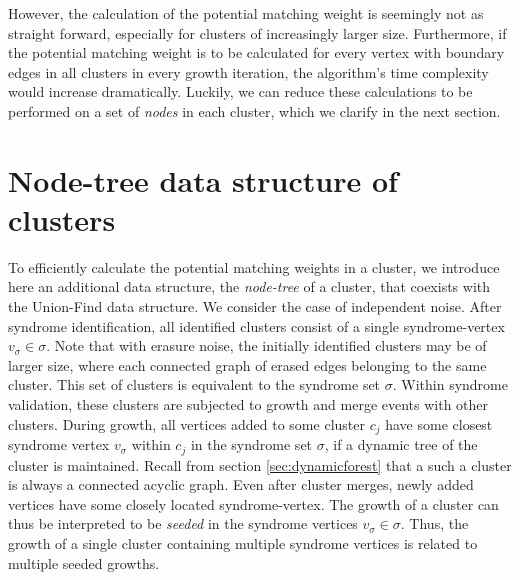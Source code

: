 However, the calculation of the potential matching weight is seemingly not as straight forward, especially for clusters of increasingly larger size. Furthermore, if the potential matching weight is to be calculated for every vertex with boundary edges in all clusters in every growth iteration, the algorithm's time complexity would increase dramatically. Luckily, we can reduce these calculations to be performed on a set of \emph{nodes} in each cluster, which we clarify in the next section.

\section{Node-tree data structure of clusters}\label{sec:nodeset}

To efficiently calculate the potential matching weights in a cluster, we introduce here an additional data structure, the \emph{node-tree} of a cluster, that coexists with the Union-Find data structure. We consider the case of independent noise. After syndrome identification, all identified clusters consist of a single syndrome-vertex $v_\sigma \in \sigma$. Note that with erasure noise, the initially identified clusters may be of larger size, where each connected graph of erased edges belonging to the same cluster. This set of clusters is equivalent to the syndrome set $\sigma$. Within syndrome validation, these clusters are subjected to growth and merge events with other clusters. During growth, all vertices added to some cluster $c_j$ have some closest syndrome vertex $v_\sigma$ within $c_j$ in the syndrome set $\sigma$, if a dynamic tree of the cluster is maintained. Recall from section \ref{sec:dynamicforest} that a such a cluster is always a connected acyclic graph. Even after cluster merges, newly added vertices have some closely located syndrome-vertex. The growth of a cluster can thus be interpreted to be \emph{seeded} in the syndrome vertices $v_\sigma \in \sigma$. Thus, the growth of a single cluster containing multiple syndrome vertices is related to multiple seeded growths. 

